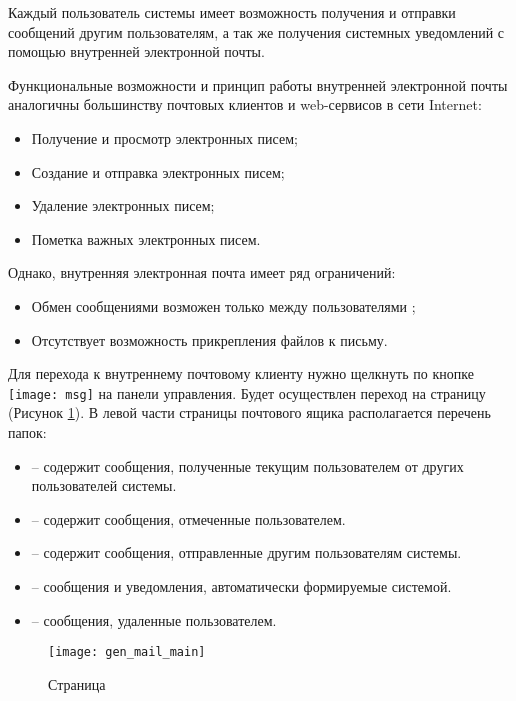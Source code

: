 Каждый пользователь системы имеет возможность получения и отправки сообщений другим пользователям, а так же получения системных уведомлений с помощью внутренней электронной почты.

Функциональные возможности и принцип работы внутренней электронной почты аналогичны большинству почтовых клиентов и web-сервисов в сети Internet:
\begin{itemize}
 \item Получение и просмотр электронных писем;
 \item Создание и отправка электронных писем;
 \item Удаление электронных писем;
 \item Пометка важных электронных писем.
\end{itemize}

Однако, внутренняя электронная почта имеет ряд ограничений:
\begin{itemize}
 \item Обмен сообщениями возможен только между пользователями \tmis;
 \item Отсутствует возможность прикрепления файлов к письму.
\end{itemize}
 
Для перехода к внутреннему почтовому клиенту нужно щелкнуть по кнопке \texttt{[image: msg]} на панели управления. Будет осуществлен переход на страницу  (Рисунок \ref{img_gen_mail_main}). В левой части страницы почтового ящика располагается перечень папок:
\begin{itemize}
 \item {} -- содержит сообщения, полученные текущим пользователем от других пользователей системы.
 \item {} -- содержит сообщения, отмеченные пользователем.
 \item {} -- содержит сообщения, отправленные другим пользователям системы.
 \item {} -- сообщения и уведомления, автоматически формируемые системой.
 \item {} -- сообщения, удаленные пользователем.
\end{itemize}

 \begin{figure}[!ht]\centering
 	\texttt{[image: gen\_mail\_main]}
 	\caption{Страница }
 	\label{img_gen_mail_main}
 \end{figure}

